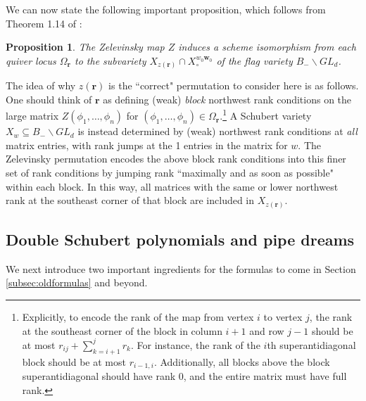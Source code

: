 \documentclass[reqno]{amsart}
\numberwithin{equation}{section}
\newtheorem{proposition}[theorem]{Proposition}
\theoremstyle{definition}
\theoremstyle{remark}
\begin{document}
We can now state the following important proposition, which follows from Theorem 1.14 of \cite{kms06}:
\begin{proposition}\label{prop:zeliso}
The Zelevinsky map $Z$ induces a scheme isomorphism from each quiver locus $\Omega_{\mathbf{r}}$ to the subvariety $X_{z(\mathbf{r})} \cap X_\circ^{w_0\mathbf{w}_0}$ of the flag variety $B_- \backslash GL_d$.
\end{proposition}
The idea of why $z(\mathbf{r})$ is the ``correct" permutation to consider here is as follows.
One should think of $\mathbf{r}$ as defining (weak) \emph{block} northwest rank conditions on the large matrix $Z(\phi_1,\dots,\phi_n)$ for $(\phi_1,\dots,\phi_n) \in \Omega_{\mathbf{r}}$.\footnote{Explicitly, to encode the rank of the map from vertex $i$ to vertex $j$, the rank at the southeast corner of the block in column $i+1$ and row $j-1$ should be at most $r_{ij}+\sum_{k={i+1}}^j r_k$. For instance, the rank of the $i$th superantidiagonal block should be at most $r_{i-1,i}$.
Additionally, all blocks above the block superantidiagonal should have rank 0, and the entire matrix must have full rank.}
A Schubert variety $X_w \subseteq B_- \backslash GL_d$ is instead determined by (weak) northwest rank conditions at \emph{all} matrix entries, with rank jumps at the 1 entries in the matrix for $w$. The Zelevinsky permutation encodes the above block rank conditions into this finer set of rank conditions by jumping rank ``maximally and as soon as possible" within each block. In this way, all matrices with the same or lower northwest rank at the southeast corner of that block are included in $X_{z(\mathbf{r})}$.

\subsection{Double Schubert polynomials and pipe dreams}
We next introduce two important ingredients for the formulas to come in Section \ref{subsec:oldformulas} and beyond.
\end{document}
